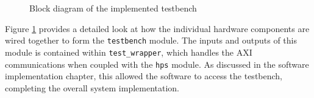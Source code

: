 \begin{sidewaysfigure}
  \begin{figure}[H]
    \centering
    
    \caption{Block diagram of the implemented testbench}
    \label{DBlock}
  \end{figure}
\end{sidewaysfigure}

Figure \ref{DBlock} provides a detailed look at how the individual hardware components are wired together to form the \texttt{testbench} module.
The inputs and outputs of this module is contained within \texttt{test\_wrapper}, which handles the AXI communications when coupled with the \texttt{hps} module.
As discussed in the software implementation chapter, this allowed the software to access the testbench, completing the overall system implementation.
